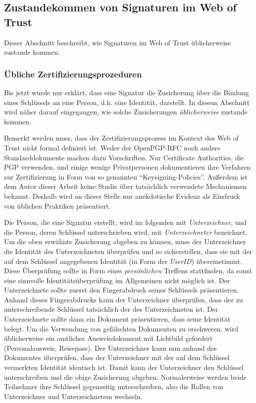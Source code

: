 \subsection{Zustandekommen von Signaturen im Web of Trust}
\label{sec:sozi-komp-des}
Dieser Abschnitt beschreibt, wie Signaturen im Web of Trust
\"ublicherweise zustande kommen.

\subsubsection{Übliche Zertifizierungsprozeduren}
\label{sec:ubliche-zert}

Bis jetzt wurde nur erklärt, dass eine Signatur die
Zusicherung über die Bindung eines Schlüssels an eine Person,
d.h. eine Identität, darstellt. In diesem Abschnitt wird näher
darauf eingegangen, wie solche Zusicherungen \emph{üblicherweise}
zustande kommen.

Bemerkt werden muss, dass der Zertifizierungsprozess im Kontext des
Web of Trust nicht formal definiert ist. Weder der OpenPGP-RFC noch
andere Standarddokumente machen dazu Vorschriften. Nur Certificate
Authorities, die PGP verwenden, und einige wenige Privatpersonen
dokumentieren ihre Verfahren zur Zertifizierung in Form von
so genannten "`Keysigning-Policies"'. Außerdem ist dem Autor dieser
Arbeit keine Studie über tatsächlich verwendete Mechanismen
bekannt. Deshalb wird an dieser Stelle nur anekdotische Evidenz
als Eindruck von üblichen Praktiken präsentiert.

Die Person, die eine Signatur erstellt, wird im folgenden mit
\emph{Unterzeichner}, und die Person, deren Schlüssel
unterschrieben wird, mit \emph{Unterzeichneter} bezeichnet. Um
die oben erwähnte Zusicherung abgeben zu können, muss der
Unterzeichner die Identität des Unterzeichneten überprüfen und
so sicherstellen, dass sie mit der auf dem Schlüssel angegebenen
Identität (in Form der \emph{UserID}) übereinstimmt. Diese
Überprüfung sollte in Form eines \emph{persönlichen} Treffens
stattfinden, da sonst eine sinnvolle Identitätsüberprüfung im
Allgemeinen nicht möglich ist. Der Unterzeichnete sollte zuerst den
Fingerabdruck seines Schlüssels präsentieren. Anhand dieses
Fingerabdrucks kann der Unterzeichner überprüfen, dass der zu
unterschreibende Schlüssel tatsächlich der des Unterzeichneten
ist.  Der Unterzeichnete sollte dann ein Dokument präsentieren, dass
seine Identität belegt. Um die Verwendung von gefälschten
Dokumenten zu erschweren, wird üblicherweise ein amtliches
Ausweisdokument mit Lichtbild gefordert (Personalausweis,
Reisepass). Der Unterzeichner kann nun anhand des Dokumentes
überprüfen, dass der Unterzeichner mit der auf dem Schlüssel
vermerkten Identität identisch ist. Damit kann der Unterzeichner den
Schlüssel unterschreiben und die obige Zusicherung
abgeben. Normalerweise werden beide Teilnehmer ihre Schlüssel
gegenseitig unterschreiben, also die Rollen von Unterzeichner und
Unterzeichnetem wechseln.

